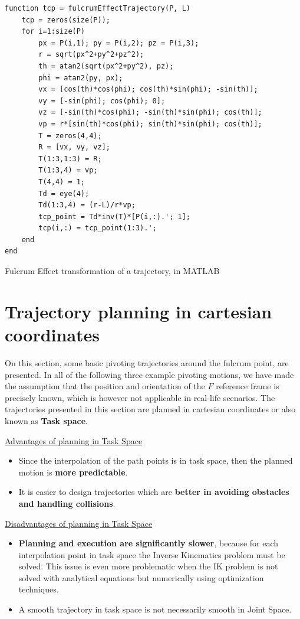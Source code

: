 \begin{listing}[H]
\begin{verbatim}
function tcp = fulcrumEffectTrajectory(P, L)
    tcp = zeros(size(P));
    for i=1:size(P)
        px = P(i,1); py = P(i,2); pz = P(i,3);
        r = sqrt(px^2+py^2+pz^2);
        th = atan2(sqrt(px^2+py^2), pz);
        phi = atan2(py, px);
        vx = [cos(th)*cos(phi); cos(th)*sin(phi); -sin(th)];
        vy = [-sin(phi); cos(phi); 0];
        vz = [-sin(th)*cos(phi); -sin(th)*sin(phi); cos(th)];
        vp = r*[sin(th)*cos(phi); sin(th)*sin(phi); cos(th)];
        T = zeros(4,4);
        R = [vx, vy, vz];
        T(1:3,1:3) = R;
        T(1:3,4) = vp;
        T(4,4) = 1;
        Td = eye(4);
        Td(1:3,4) = (r-L)/r*vp;
        tcp_point = Td*inv(T)*[P(i,:).'; 1];
        tcp(i,:) = tcp_point(1:3).';
    end
end
\end{verbatim}
\caption{Fulcrum Effect transformation of a trajectory, in MATLAB}
\label{code:fulcrum_effect_traj_matlab}
\end{listing}


\section{Trajectory planning in cartesian coordinates}
\label{section:pivot-motions}

On this section, some basic pivoting trajectories around the fulcrum point, are presented. In all of the following three example pivoting motions, we have made 
the assumption that the position and orientation of the ${F}$ reference frame is precisely known, which is however not applicable in real-life scenarios. The trajectories 
presented in this section are planned in cartesian coordinates or also known as \textbf{Task space}.

\underline{Advantages of planning in Task Space}
\begin{itemize}
\item Since the interpolation of the path points is in task space, then the planned motion is \textbf{more predictable}.
\item It is easier to design trajectories which are \textbf{better in avoiding obstacles and handling collisions}.
\end{itemize}

\underline{Disadvantages of planning in Task Space}
\begin{itemize}
\item \textbf{Planning and execution are significantly slower}, because for each interpolation point in task space the Inverse Kinematics problem must be solved. This issue is
even more problematic when the IK problem is not solved with analytical equations but numerically using optimization techniques.
\item A smooth trajectory in task space is not necessarily smooth in Joint Space.
\end{itemize}

